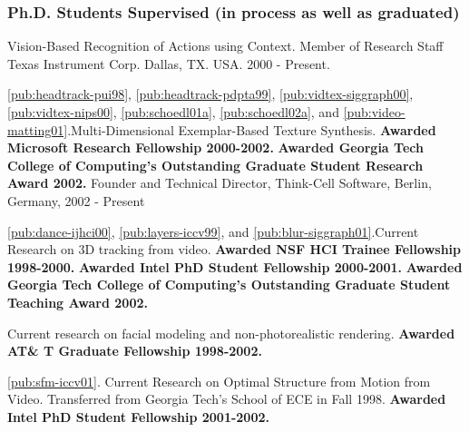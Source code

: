 \subsubsection*{Ph.D. Students Supervised (in process as well as
graduated)}


\begin{description}

 {Vision-Based
Recognition of Actions using Context.
\newline Member of Research Staff Texas Instrument
Corp. Dallas, TX. USA. 2000 - Present.}

 {
\ref{pub:headtrack-pui98}, \ref{pub:headtrack-pdpta99},
\ref{pub:vidtex-siggraph00}, \ref{pub:vidtex-nips00},
\ref{pub:schoedl01a}, \ref{pub:schoedl02a}, and \ref{pub:video-matting01}.}{Multi-Dimensional Exemplar-Based Texture Synthesis.
\newline \textbf{Awarded Microsoft Research Fellowship 2000-2002.}
\newline \textbf{Awarded Georgia Tech College of Computing's Outstanding Graduate Student Research Award 2002.}
\newline Founder and Technical Director, Think-Cell Software, Berlin, Germany, 2002 - Present}

{\ref{pub:dance-ijhci00}, \ref{pub:layers-iccv99},
and \ref{pub:blur-siggraph01}.}{Current Research
on 3D tracking from video.
\newline \textbf{Awarded NSF HCI Trainee Fellowship 1998-2000.}
\newline \textbf{Awarded Intel PhD Student Fellowship 2000-2001.}
\newline \textbf{Awarded Georgia Tech College of Computing's Outstanding Graduate Student Teaching Award 2002.}}

 {Current
research on facial modeling and non-photorealistic rendering.
\newline \textbf{Awarded AT\& T Graduate Fellowship 1998-2002.}}

 {
\ref{pub:sfm-iccv01}.} {Current Research on Optimal Structure from
Motion from Video. \newline Transferred from Georgia Tech's School
of ECE in Fall 1998. \newline \textbf{Awarded Intel PhD Student
Fellowship 2001-2002.} }


\end{description}
